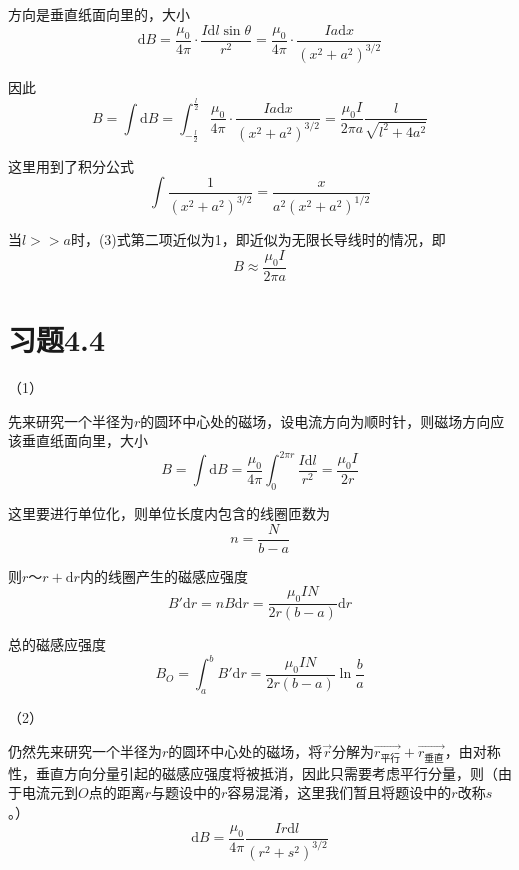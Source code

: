 \documentclass{SCIS2020cn}
\begin{document}
方向是垂直纸面向里的，大小
\begin{equation}
    \text{d}B=\frac{\mu_0}{4\pi}·\frac{I\text{d}l\sin\theta}{r^2}=\frac{\mu_0}{4\pi}·\frac{Ia\text{d}x}{(x^2+a^2)^{3/2}}
\end{equation}

因此
\begin{equation}
    B=\int\text{d}B=\int_{-\frac{l}{2}}^{\frac{l}{2}}\frac{\mu_0}{4\pi}·\frac{Ia\text{d}x}{(x^2+a^2)^{3/2}}=\frac{\mu_0I}{2\pi{}a}\frac{l}{\sqrt{l^2+4a^2}}
\end{equation}

这里用到了积分公式
\begin{equation}
    \int\frac{1}{(x^2+a^2)^{3/2}}=\frac{x}{a^2(x^2+a^2)^{1/2}}
\end{equation}

当$l>>a$时，(3)式第二项近似为1，即近似为无限长导线时的情况，即
\begin{equation}
    B\approx\frac{\mu_0I}{2\pi{}a}
\end{equation}

\section{习题4.4}
（1）

先来研究一个半径为$r$的圆环中心处的磁场，设电流方向为顺时针，则磁场方向应该垂直纸面向里，大小
\begin{equation}
    B=\int\text{d}B=\frac{\mu_0}{4\pi}\int_0^{2\pi{}r}\frac{I\text{d}l}{r^2}=\frac{\mu_0I}{2r}
\end{equation}

这里要进行单位化，则单位长度内包含的线圈匝数为
\begin{equation}
    n=\frac{N}{b-a}
\end{equation}

则$r$～$r+\text{d}r$内的线圈产生的磁感应强度
\begin{equation}
    B'\text{d}r=nB\text{d}r=\frac{\mu_0IN}{2r(b-a)}\text{d}r
\end{equation}

总的磁感应强度
\begin{equation}
    B_{O}=\int_a^b{}B'\text{d}r=\frac{\mu_0IN}{2r(b-a)}\ln\frac{b}{a}
\end{equation}

（2）

仍然先来研究一个半径为$r$的圆环中心处的磁场，将$\overrightarrow{r}$分解为$\overrightarrow{r_{\text{平行}}}+\overrightarrow{r_{\text{垂直}}}$，由对称性，垂直方向分量引起的磁感应强度将被抵消，因此只需要考虑平行分量，则（由于电流元到$O$点的距离$r$与题设中的$r$容易混淆，这里我们暂且将题设中的$r$改称$s$。）
\begin{equation}
    \text{d}B=\frac{\mu_0}{4\pi}\frac{Ir\text{d}l}{(r^2+s^2)^{3/2}}
\end{equation}
\end{document}
